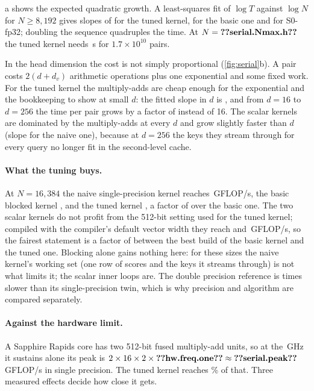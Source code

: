 a shows the expected quadratic growth. A least-squares fit of
$\log T$ against $\log N$ for $N\ge8{,}192$ gives slopes of 
for the tuned kernel,  for the basic one and
 for S0-fp32; doubling the sequence quadruples the time. At
$N=\n{serial.Nmax.h}$ the tuned kernel needs \,s for
$1.7\times10^{10}$ pairs.

In the head dimension the cost is not simply proportional (\cref{fig:serial}b). A
pair costs $2(d+d_v)$ arithmetic operations plus one exponential and some fixed
work. For the tuned kernel the multiply-adds are cheap enough for the exponential
and the bookkeeping to show at small $d$: the fitted slope in $d$ is
, and from $d=16$ to $d=256$ the time per pair grows by a
factor of  instead of 16. The scalar kernels are dominated
by the multiply-adds at every $d$ and grow slightly faster than $d$
(slope  for the naive one), because at $d=256$ the keys they
stream through for every query no longer fit in the second-level cache.

\paragraph{What the tuning buys.} At $N=16{,}384$ the naive single-precision kernel
reaches \,GFLOP/s, the basic blocked kernel
, and the tuned kernel , a factor of
 over the basic one. The two scalar kernels do not profit
from the 512-bit setting used for the tuned kernel; compiled with the compiler's
default vector width they reach  and
\,GFLOP/s, so the fairest statement is a factor of
 between the best build of the basic kernel and the tuned
one. Blocking alone gains nothing here: for these sizes the naive kernel's working
set (one row of scores and the keys it streams through) is not what limits it; the
scalar inner loops are. The double precision reference is 
times slower than its single-precision twin, which is why precision and algorithm
are compared separately.

\paragraph{Against the hardware limit.} A Sapphire Rapids core has two 512-bit
fused multiply-add units, so at the \,GHz it sustains alone its peak
is $2\times16\times2\times\n{hw.freq.one}\approx\n{serial.peak}$\,GFLOP/s in single
precision. The tuned kernel reaches \% of that. Three measured
effects decide how close it gets.

